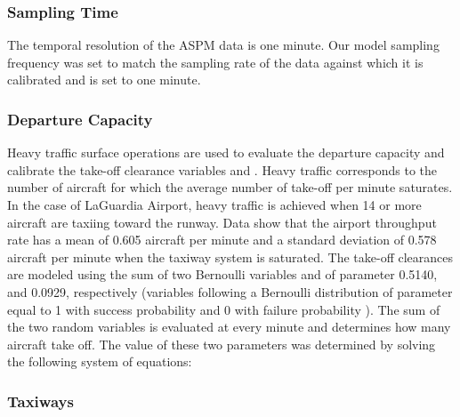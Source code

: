 \documentclass[letterpaper]{article}
\begin{document}
\subsubsection{Sampling Time}
 The temporal resolution of the ASPM data is one minute. Our model sampling frequency was set to match the sampling rate 
 of the data against which it is calibrated and  is set to one minute.

\subsubsection{Departure Capacity}
 Heavy traffic surface operations are used to evaluate the departure capacity and 
 calibrate the take-off clearance variables  and . Heavy traffic corresponds to the number of aircraft for which the average 
  number of take-off per minute saturates. In the case of LaGuardia Airport, heavy traffic is achieved when 14 or more aircraft are 
  taxiing toward the runway.
  Data show that the airport throughput rate has a mean of 0.605 aircraft per minute and a standard deviation of 0.578 aircraft
per minute when the taxiway system is saturated. The take-off clearances are modeled using the sum of two Bernoulli variables  and  
of parameter 0.5140, and 0.0929, respectively (variables following a Bernoulli distribution of parameter  equal to 1 with success probability
 and 0 with failure probability ).  The sum of the two random variables is evaluated at every minute and determines how many aircraft 
take off. 
The value of these two parameters was determined by solving the following system of equations:

  


\subsubsection{Taxiways}
\end{document}
